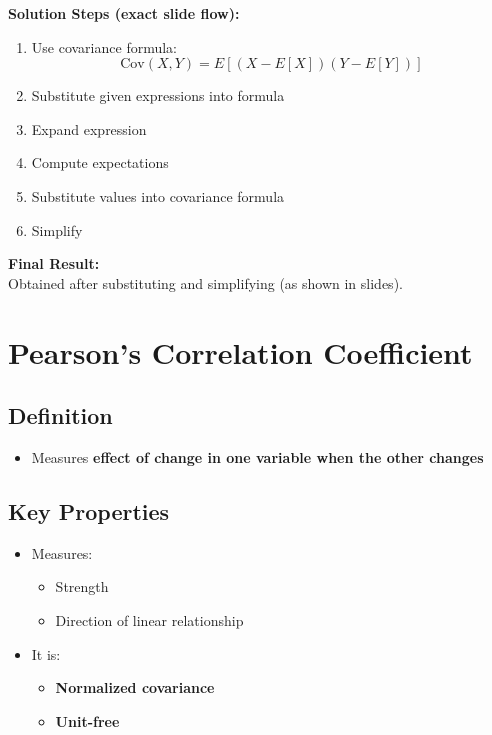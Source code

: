 \documentclass[12pt]{article}
\begin{document}
\textbf{Solution Steps (exact slide flow):}

\begin{enumerate}
    \item Use covariance formula:
    \[
    \text{Cov}(X,Y) = E[(X - E[X])(Y - E[Y])]
    \]
    \item Substitute given expressions into formula
    \item Expand expression
    \item Compute expectations
    \item Substitute values into covariance formula
    \item Simplify
\end{enumerate}

\textbf{Final Result:} \\
Obtained after substituting and simplifying (as shown in slides).

\section{Pearson’s Correlation Coefficient}

\subsection*{Definition}

\begin{itemize}
    \item Measures \textbf{effect of change in one variable when the other changes}
\end{itemize}

\subsection*{Key Properties}

\begin{itemize}
    \item Measures:
    \begin{itemize}
        \item Strength
        \item Direction of linear relationship
    \end{itemize}
    \item It is:
    \begin{itemize}
        \item \textbf{Normalized covariance}
        \item \textbf{Unit-free}
    \end{itemize}
\end{itemize}
\end{document}
